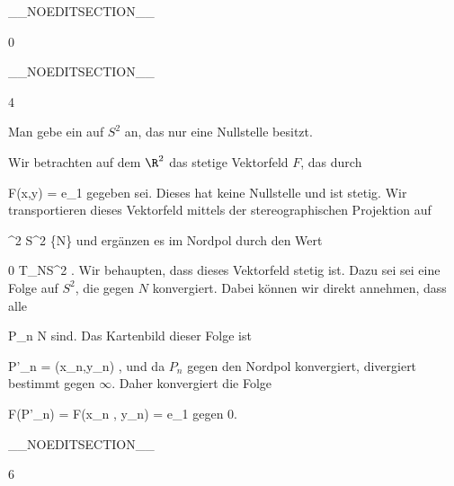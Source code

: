 __NOEDITSECTION__

{0}

{

}
{  }

__NOEDITSECTION__

{4}

{

Man gebe ein
 
auf $S^2$ an, das nur eine Nullstelle besitzt.

}
{

Wir betrachten auf dem $\R^2$ das stetige Vektorfeld $F$, das durch

\mavergleichskettedisp
{\vergleichskette
{F(x,y)
}
{ =} { {  }  e_1
}
{ } {
}
{ } {
}
{ } {
}
}
{}{}{}
gegeben sei. Dieses hat keine Nullstelle und ist stetig. Wir transportieren dieses Vektorfeld mittels der stereographischen Projektion auf

\mavergleichskette
{\vergleichskette
{  \R^2
}
{ \cong }{ S^2 \setminus \{N\}
}
{  }{
}
{    }{
}
{   }{
}
}
{}{}{}
und ergänzen es im Nordpol durch den Wert

\mavergleichskette
{\vergleichskette
{ 0
}
{ \in }{  T_NS^2
}
{  }{
}
{    }{
}
{   }{
}
}
{}{}{.}
Wir behaupten, dass dieses Vektorfeld stetig ist. Dazu sei
 sei eine Folge auf $S^2$, die gegen $N$ konvergiert. Dabei können wir direkt annehmen, dass alle

\mavergleichskette
{\vergleichskette
{P_n
}
{ \neq }{N
}
{  }{
}
{    }{
}
{   }{
}
}
{}{}{}
sind. Das Kartenbild dieser Folge ist

\mavergleichskettedisp
{\vergleichskette
{P'_n
}
{ =} { (x_n,y_n)
}
{ } {
}
{ } {
}
{ } {
}
}
{}{}{,}
und da $P_n$ gegen den Nordpol konvergiert, divergiert
 bestimmt gegen $\infty$. Daher konvergiert die Folge

\mavergleichskettedisp
{\vergleichskette
{ F(P'_n)
}
{ =} { F(x_n , y_n)
}
{ =} { {  } e_1
}
{ } {
}
{ } {
}
}
{}{}{}
gegen $0$.

 }

__NOEDITSECTION__

{6}

